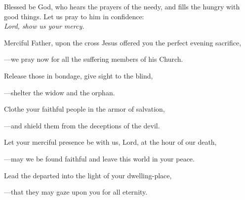 \intercessions\indent

\begin{hangpar}

Blessed be God, who hears the prayers of the needy, and fills the hungry with good things. Let us pray to him in confidence:\\
\emph{Lord, show us your mercy.}

\medskip Merciful Father, upon the cross Jesus offered you the perfect evening sacrifice,

{\color{red}---\thinspace}we pray now for all the suffering members of his Church.

\medskip Release those in bondage, give sight to the blind,

{\color{red}---\thinspace}shelter the widow and the orphan.

\medskip Clothe your faithful people in the armor of salvation,

{\color{red}---\thinspace}and shield them from the deceptions of the devil.

\medskip Let your merciful presence be with us, Lord, at the hour of our death,

{\color{red}---\thinspace}may we be found faithful and leave this world in your peace.

\medskip Lead the departed into the light of your dwelling-place,

{\color{red}---\thinspace}that they may gaze upon you for all eternity.

\end{hangpar}

